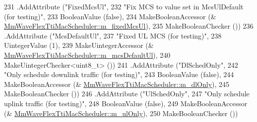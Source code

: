 \begin{DoxyCode}
231          .AddAttribute (\textcolor{stringliteral}{"FixedMcsUl"},
232                                                                         \textcolor{stringliteral}{"Fix MCS to value set in
       McsUlDefault (for testing)"},
233                                                                         BooleanValue (\textcolor{keyword}{false}),
234                                                                         MakeBooleanAccessor (&
      \hyperlink{classns3_1_1MmWaveFlexTtiMacScheduler_adcb65237e784d0154cc892e9eafdc883}{MmWaveFlexTtiMacScheduler::m\_fixedMcsUl}),
235                                                                         MakeBooleanChecker ())
236         .AddAttribute (\textcolor{stringliteral}{"McsDefaultUl"},
237                                                                  \textcolor{stringliteral}{"Fixed UL MCS (for testing)"},
238                                                                  UintegerValue (1),
239                                                                  MakeUintegerAccessor (&
      \hyperlink{classns3_1_1MmWaveFlexTtiMacScheduler_a9f55a65641298174b3674300bc45f5a0}{MmWaveFlexTtiMacScheduler::m\_mcsDefaultUl}),
240                                                                  MakeUintegerChecker<uint8\_t> ())
241          .AddAttribute (\textcolor{stringliteral}{"DlSchedOnly"},
242                                                                         \textcolor{stringliteral}{"Only schedule downlink traffic
       (for testing)"},
243                                                                         BooleanValue (\textcolor{keyword}{false}),
244                                                                         MakeBooleanAccessor (&
      \hyperlink{classns3_1_1MmWaveFlexTtiMacScheduler_a41cc41f208cd4be60b44da4668a75c7b}{MmWaveFlexTtiMacScheduler::m\_dlOnly}),
245                                                                         MakeBooleanChecker ())
246          .AddAttribute (\textcolor{stringliteral}{"UlSchedOnly"},
247                                                                         \textcolor{stringliteral}{"Only schedule uplink traffic (for
       testing)"},
248                                                                         BooleanValue (\textcolor{keyword}{false}),
249                                                                         MakeBooleanAccessor (&
      \hyperlink{classns3_1_1MmWaveFlexTtiMacScheduler_ac9a7f43505a88bb77adc0e3845e42a83}{MmWaveFlexTtiMacScheduler::m\_ulOnly}),
250                                                                         MakeBooleanChecker ())

\end{DoxyCode}
